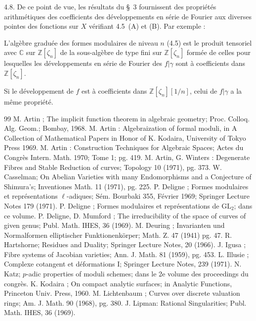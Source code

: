 \documentclass[12pt,a4paper]{amsart}
\theoremstyle{plain}
\theoremstyle{definition}
\theoremstyle{remark}
\newcommand{\ZZ}{\mathbb{Z}}
\newcommand{\CC}{\mathbb{C}}
\begin{document}
4.8. De ce point de vue, les r\'esultats du \S~3 fournissent des propri\'et\'es arithm\'etiques des coefficients des d\'eveloppements en s\'erie de Fourier aux diverses pointes des fonctions sur $X$ v\'erifiant 4.5~(A) et (B). Par exemple :

L'alg\`ebre gradu\'ee des formes modulaires de niveau $n$ (4.5) est le produit tensoriel avec $\CC$ sur $\ZZ[\zeta_n]$ de la sous-alg\`ebre de type fini sur $\ZZ[\zeta_n]$ form\'ee de celles pour lesquelles les d\'eveloppements en s\'erie de Fourier des $f|\gamma$ sont \`a coefficients dans $\ZZ[\zeta_n]$.

Si le d\'eveloppement de $f$ est \`a coefficients dans $\ZZ[\zeta_n][1/n]$, celui de $f|\gamma$ a la m\^eme propri\'et\'e.

\begin{thebibliography}{99}
 M. Artin ; The implicit function theorem in algebraic geometry; Proc. Colloq. Alg. Geom.; Bombay, 1968.
 M. Artin : Algebraization of formal moduli, in A Collection of Mathematical Papers in Honor of K. Kodaira, University of Tokyo Press 1969.
 M. Artin : Construction Techniques for Algebraic Spaces; Actes du Congr\`es Intern. Math. 1970; Tome 1; pg. 419.
 M. Artin, G. Winters : Degenerate Fibres and Stable Reduction of curves; Topology 10 (1971), pg. 373.
 W. Casselman; On Abelian Varieties with many Endomorphisms and a Conjecture of Shimura's; Inventiones Math. 11 (1971), pg. 225.
 P. Deligne ; Formes modulaires et repr\'esentations $\ell$-adiques; S\'em. Bourbaki 355, F\'evrier 1969; Springer Lecture Notes 179 (1971).
 P. Deligne ; Formes modulaires et repr\'esentations de $\mathrm{GL}_2$; dans ce volume.
 P. Deligne, D. Mumford ; The irreducibility of the space of curves of given genus; Publ. Math. IHES, 36 (1969).
 M. Deuring ; Invarianten und Normalformen elliptischer Funktionenk\"orper; Math. Z. 47 (1941) pg. 47.
 R. Hartshorne; Residues and Duality; Springer Lecture Notes, 20 (1966).
 J. Igusa ; Fibre systems of Jacobian varieties; Ann. J. Math. 81 (1959), pg. 453.
 L. Illusie ; Complexe cotangent et d\'eformations I; Springer Lecture Notes, 239 (1971).
 N. Katz; $p$-adic properties of moduli schemes; dans le 2e volume des proceedings du congr\`es.
 K. Kodaira ; On compact analytic surfaces; in Analytic Functions, Princeton Univ. Press, 1960.
 M. Lichtenbaum ; Curves over discrete valuation rings; Am. J. Math. 90 (1968), pg. 380.
 J. Lipman: Rational Singularities; Publ. Math. IHES, 36 (1969).

\end{thebibliography}
\end{document}
